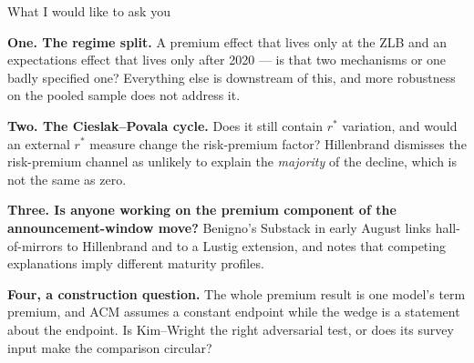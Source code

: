 \documentclass[aspectratio=169, 11pt]{beamer}
\newcommand{\rstar}{r^{*}}
\begin{document}
\begin{frame}{What I would like to ask you}

\textbf{One. The regime split.} A premium effect that lives only at the ZLB
and an expectations effect that lives only after 2020 --- is that two
mechanisms or one badly specified one? Everything else is downstream of this,
and more robustness on the pooled sample does not address it.

\vspace{0.6em}

\textbf{Two. The Cieslak--Povala cycle.} Does it still contain $\rstar$
variation, and would an external $\rstar$ measure change the risk-premium
factor? Hillenbrand dismisses the risk-premium channel as unlikely to explain
the \emph{majority} of the decline, which is not the same as zero.

\vspace{0.6em}

\textbf{Three. Is anyone working on the premium component of the
announcement-window move?} Benigno's Substack in early August links
hall-of-mirrors to Hillenbrand and to a Lustig extension, and notes that
competing explanations imply different maturity profiles.

\vspace{0.6em}

\textbf{Four, a construction question.} The whole premium result is one
model's term premium, and ACM assumes a constant endpoint while the wedge is
a statement about the endpoint. Is Kim--Wright the right adversarial test, or
does its survey input make the comparison circular?

\end{frame}
\end{document}
